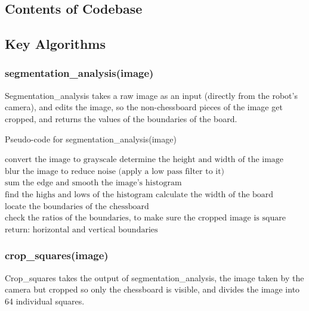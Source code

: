 \documentclass[onecolumn]{IEEEtran}
\begin{document}
\subsection{Contents of Codebase}
\subsection{Key Algorithms}
\subsubsection{segmentation\_analysis(image)}
Segmentation\_analysis takes a raw image as an input (directly from the robot's camera), and edits the image, so the non-chessboard pieces of the image get cropped, and returns the values of the boundaries of the board.

\begin{algorithm}[H]
\caption{Pseudo-code for segmentation\_analysis(image)}
\begin{algorithmic}[1]
\STATE {}
\STATE$\text{convert the image to grayscale}$
\STATE$\text{determine the height and width of the image}$ 
\STATE$\text{blur the image to reduce noise (apply a low pass filter to it)}$
\STATE {}
\STATEx {} 
\STATE$\text{sum the edge and smooth the image's histogram}$ 
\STATE$\text{find the highs and lows of the histogram}$
\STATE$\text{calculate the width of the board}$
\STATE$\text{locate the boundaries of the chessboard}$
\STATE$\text{check the ratios of the boundaries, to make sure the cropped image is square}$
\STATE $\text{return: horizontal and vertical boundaries}$
\end{algorithmic}
\end{algorithm}

 
\subsubsection{crop\_squares(image)} 
Crop\_squares takes the output of segmentation\_analysis, the image taken by the camera but cropped so only the chessboard is visible, and divides the image into 64 individual squares. 
\end{document}
